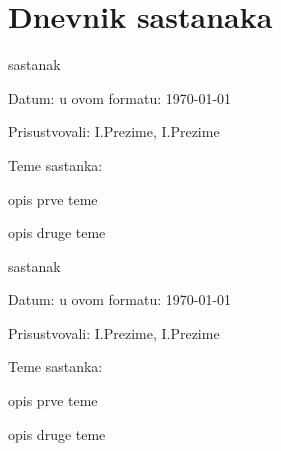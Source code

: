 \chapter{Dnevnik sastanaka}


\begin{packed_enum}
	\item  sastanak
	
	\item[] \begin{packed_item}
		\item Datum: u ovom formatu: \today
		\item Prisustvovali: I.Prezime, I.Prezime
		\item Teme sastanka:
		\begin{packed_item}
			\item  opis prve teme
			\item  opis druge teme
		\end{packed_item}
	\end{packed_item}
	
	\item  sastanak
	\item[] \begin{packed_item}
		\item Datum: u ovom formatu: \today
		\item Prisustvovali: I.Prezime, I.Prezime
		\item Teme sastanka:
		\begin{packed_item}
			\item  opis prve teme
			\item  opis druge teme
		\end{packed_item}
	\end{packed_item}
	
	
\end{packed_enum}



